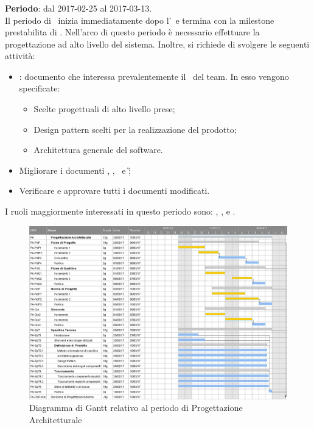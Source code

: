 		
		\subsubsection{\PA}
		\textbf{Periodo}: dal 2017-02-25 al 2017-03-13.\\
		Il periodo di \PA\ inizia immediatamente dopo l'\AR\ e termina con la milestone prestabilita di \RPMin. Nell'arco di questo periodo è necessario effettuare la progettazione ad alto livello del sistema. Inoltre, si richiede di svolgere le seguenti attività:
		\begin{itemize}
			\item \textit{\ST}: documento che interessa prevalentemente il \textit{\Prog}\ del team. In esso vengono specificate:
			\begin{itemize}
				\item Scelte progettuali di alto livello prese;
				\item Design pattern scelti per la realizzazione del prodotto;
				\item Architettura generale del software.
			\end{itemize}
			\item Migliorare i documenti \NdP, \PdP, \PdQ\ e \G;
			\item Verificare e approvare tutti i documenti modificati.
		\end{itemize}
		I ruoli maggiormente interessati in questo periodo sono: \textit{\Amm}, \textit{\Res}, \textit{\Prog} e \textit{\Ver}.
		
		\begin{figure}[H]
			\centering
			\includegraphics[scale=0.4]{img/ganttnetbreak3.png}
			\caption{Diagramma di Gantt relativo al periodo di Progettazione Architetturale}
		\end{figure}

